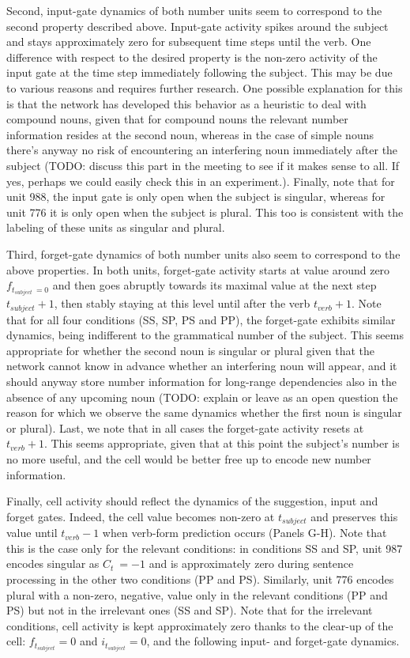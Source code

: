 Second, input-gate dynamics of both number units seem to correspond to the second property described above. Input-gate activity spikes around the subject and stays approximately zero for subsequent time steps until the verb. One difference with respect to the desired property is the non-zero activity of the input gate at the time step immediately following the subject. This may be due to various reasons and requires further research. One possible explanation for this is that the network has developed this behavior as a heuristic to deal with compound nouns, given that for compound nouns the relevant number information resides at the second noun, whereas in the case of simple nouns there's anyway no risk of encountering an interfering noun immediately after the subject (TODO: discuss this part in the meeting to see if it makes sense to all. If yes, perhaps we could easily check this in an experiment.). Finally, note that for unit 988, the input gate is only open when the subject is singular, whereas for unit 776 it is only open when the subject is plural. This too is consistent with the labeling of these units as singular and plural.

Third, forget-gate dynamics of both number units also seem to correspond to the above properties. In both units, forget-gate activity starts at value around zero $f_{t_{subject}~=0}$ and then goes abruptly towards its maximal value at the next step $t_{subject}+1$, then stably staying at this level until after the verb $t_{verb}+1$. Note that for all four conditions (SS, SP, PS and PP), the forget-gate exhibits similar dynamics, being indifferent to the grammatical number of the subject. This seems appropriate for whether the second noun is singular or plural given that the network cannot know in advance whether an interfering noun will appear, and it should anyway store number information for long-range dependencies also in the absence of any upcoming noun (TODO: explain or leave as an open question the reason for which we observe the same dynamics whether the first noun is singular or plural). Last, we note that in all cases the forget-gate activity resets at $t_{verb}+1$. This seems appropriate, given that at this point the subject's number is no more useful, and the cell would be better free up to encode new number information.
 
Finally, cell activity should reflect the dynamics of the suggestion, input and forget gates. Indeed, the cell value becomes non-zero at $t_{subject}$ and preserves this value until $t_{verb}-1$ when verb-form prediction occurs (Panels G-H). Note that this is the case only for the relevant conditions: in conditions SS and SP, unit 987 encodes singular as $C_t ~= -1$ and is approximately zero during sentence processing in the other two conditions (PP and PS). Similarly, unit 776 encodes plural with a non-zero, negative, value only in the relevant conditions (PP and PS) but not in the irrelevant ones (SS and SP). Note that for the irrelevant conditions, cell activity is kept approximately zero thanks to the clear-up of the cell: $f_{t_{subject}}=0$ and $i_{t_{subject}}=0$, and the following input- and forget-gate dynamics.

